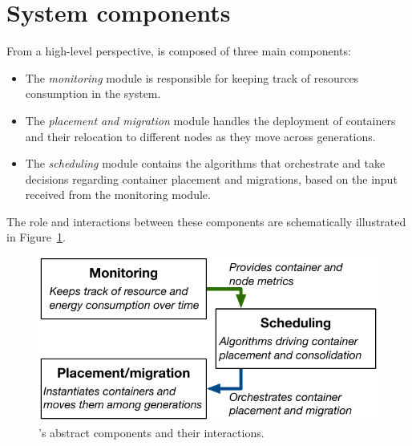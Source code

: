 
\section{System components}
\label{sec:sys_components}

From a high-level perspective, \GP is composed of three main components:
\begin{itemize}
  \item The \emph{monitoring} module is responsible for keeping track of resources consumption in the system.
  \item The \emph{placement and migration} module handles the deployment of containers and their relocation to different nodes as they move across generations.
  \item The \emph{scheduling} module contains the algorithms that orchestrate and take decisions regarding container placement and migrations, based on the input received from the monitoring module.
\end{itemize}

The role and interactions between these components are schematically illustrated in Figure~\ref{fig:components}.

\begin{figure}[H]
  \centering
  \includegraphics[]{Figures/components}
  \caption{\GP's abstract components and their interactions.}
  \label{fig:components}
\end{figure}
